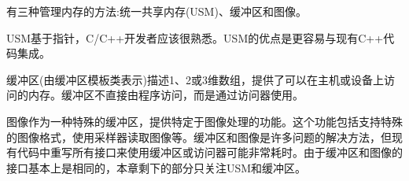 有三种管理内存的方法:统一共享内存(USM)、缓冲区和图像。\par

USM基于指针，C/C++开发者应该很熟悉。USM的优点是更容易与现有C++代码集成。\par

缓冲区(由缓冲区模板类表示)描述1、2或3维数组，提供了可以在主机或设备上访问的内存。缓冲区不直接由程序访问，而是通过访问器使用。\par

图像作为一种特殊的缓冲区，提供特定于图像处理的功能。这个功能包括支持特殊的图像格式，使用采样器读取图像等。缓冲区和图像是许多问题的解决方法，但现有代码中重写所有接口来使用缓冲区或访问器可能非常耗时。由于缓冲区和图像的接口基本上是相同的，本章剩下的部分只关注USM和缓冲区。\par